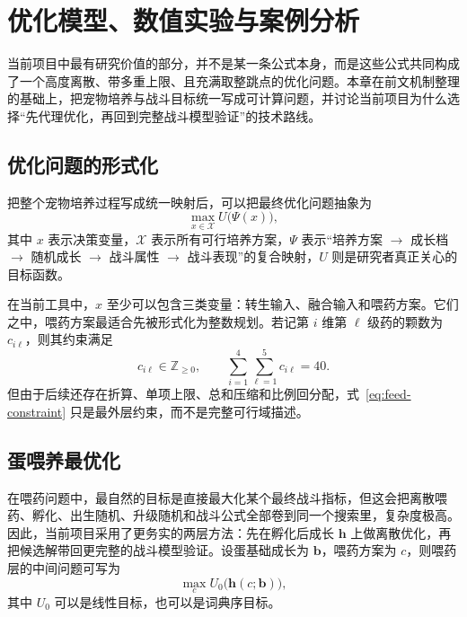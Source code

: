 \chapter{优化模型、数值实验与案例分析}

当前项目中最有研究价值的部分，并不是某一条公式本身，而是这些公式共同构成了一个高度离散、带多重上限、且充满取整跳点的优化问题。本章在前文机制整理的基础上，把宠物培养与战斗目标统一写成可计算问题，并讨论当前项目为什么选择“先代理优化，再回到完整战斗模型验证”的技术路线。

\section{优化问题的形式化}

把整个宠物培养过程写成统一映射后，可以把最终优化问题抽象为
\begin{equation}
    \max_{x \in \mathcal{X}} U\bigl(\Psi(x)\bigr),
    \label{eq:global-opt}
\end{equation}
其中 $x$ 表示决策变量，$\mathcal{X}$ 表示所有可行培养方案，$\Psi$ 表示“培养方案 $\rightarrow$ 成长档 $\rightarrow$ 随机成长 $\rightarrow$ 战斗属性 $\rightarrow$ 战斗表现”的复合映射，$U$ 则是研究者真正关心的目标函数。

在当前工具中，$x$ 至少可以包含三类变量：转生输入、融合输入和喂药方案。它们之中，喂药方案最适合先被形式化为整数规划。若记第 $i$ 维第 $\ell$ 级药的颗数为 $c_{i\ell}$，则其约束满足
\begin{equation}
    c_{i\ell} \in \mathbb{Z}_{\ge 0},
    \qquad
    \sum_{i=1}^{4}\sum_{\ell=1}^{5} c_{i\ell} = 40.
    \label{eq:feed-constraint}
\end{equation}
但由于后续还存在折算、单项上限、总和压缩和比例回分配，式~\eqref{eq:feed-constraint} 只是最外层约束，而不是完整可行域描述。

\section{蛋喂养最优化}

在喂药问题中，最自然的目标是直接最大化某个最终战斗指标，但这会把离散喂药、孵化、出生随机、升级随机和战斗公式全部卷到同一个搜索里，复杂度极高。因此，当前项目采用了更务实的两层方法：先在孵化后成长 $\bm{h}$ 上做离散优化，再把候选解带回更完整的战斗模型验证。设蛋基础成长为 $\bm{b}$，喂药方案为 $c$，则喂药层的中间问题可写为
\begin{equation}
    \max_{c} U_0\bigl(\bm{h}(c;\bm{b})\bigr),
    \label{eq:hatch-opt}
\end{equation}
其中 $U_0$ 可以是线性目标，也可以是词典序目标。

